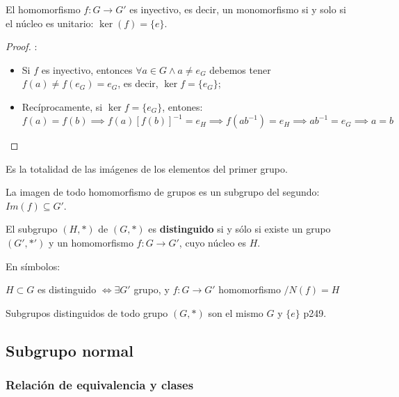 	\begin{proposition}
		El homomorfismo $f: G \rightarrow G'$ es inyectivo, es decir, un monomorfismo si y solo si el núcleo es unitario: $\ker(f) = \{ e\}$.
	\end{proposition}
	\begin{proof}:
		\begin{itemize}
			\item Si $f$ es inyectivo, entonces $\forall a \in G \land a \ne e_G$ debemos tener $f(a) \ne f(e_G) = e_G$, es decir, $\ker f = \{e_G\}$;
			\item Recíprocamente, si $\ker f = \{ e_G\}$, entones: $f(a) = f(b) \implies f(a) \left[f(b)\right]^{-1} = e_H \implies f(ab^{-1}) = e_H \implies ab^{-1}=e_G \implies a=b$
		\end{itemize}
	\end{proof}


	\begin{fmd-definition}
		Es la totalidad de las imágenes de los elementos del primer grupo.
	\end{fmd-definition}
	
	\begin{proposition}
		La imagen de todo homomorfismo de grupos es un subgrupo del segundo: $Im(f) \subseteq G'$.
	\end{proposition}


	\begin{definition}
		El subgrupo $(H, *)$ de $(G, *)$ es \textbf{distinguido} si y sólo si existe un grupo $(G', *')$ y un homomorfismo $f: G \rightarrow G'$, cuyo núcleo es $H$.
		
		En símbolos:
		
		$H \subset G$ es distinguido $\iff \exists G'$ grupo, y $f:G \rightarrow G'$ homomorfismo $/ N(f) = H$
	\end{definition}
	
	Subgrupos distinguidos de todo grupo $(G, *)$ son el mismo $G$ y $\{e\}$ \cite{rojoAlgebra8vaEd} p249.

\subsection{Subgrupo normal} \label{sec:subgrupo_normal}

	\subsubsection{Relación de equivalencia y clases}
	
